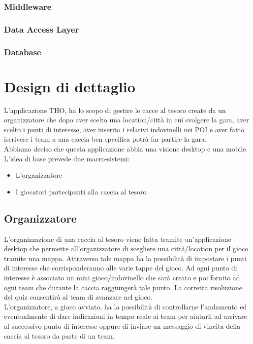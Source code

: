\documentclass[12pt, italian]{article}
\begin{document}
\subsubsection{Middleware}
\subsubsection{Data Access Layer}
\subsubsection{Database}

\section{Design di dettaglio}
L'applicazione THO, ha lo scopo di gestire le cacce al tesoro create da un organizzatore che dopo aver scelto una location/città in cui svolgere la gara, aver scelto i punti di interesse, aver inserito i relativi indovinelli nei POI e aver fatto iscrivere i team a una caccia ben specifica potrà far partire la gara.
\\Abbiamo deciso che questa applicazione abbia una visione desktop e una mobile.
L’idea di base prevede due macro-sistemi:
\begin{itemize}
	\item L'organizzatore
	\item I giocatori partecipanti alla caccia al tesoro
\end{itemize}
\subsection{Organizzatore}
L’organizzazione di una caccia al tesoro viene fatta tramite un’applicazione desktop che permette all'organizzatore di scegliere una città/location per il gioco tramite una mappa. Attraverso tale mappa ha la possibilità di impostare i punti di interesse che corrisponderanno alle varie tappe del gioco. Ad ogni punto di interesse è associato un mini gioco/indovinello che sarà creato e poi fornito ad ogni team che durante la caccia raggiungerà tale punto. La corretta risoluzione del quiz consentirà al team di avanzare nel gioco.\\
L'organizzatore, a gioco avviato, ha la possibilità di controllarne l'andamento ed eventualmente di dare indicazioni in tempo reale ai team per aiutarli ad arrivare al successivo punto di interesse oppure di inviare un messaggio di vincita della caccia al tesoro da parte di un team.\\
\end{document}
